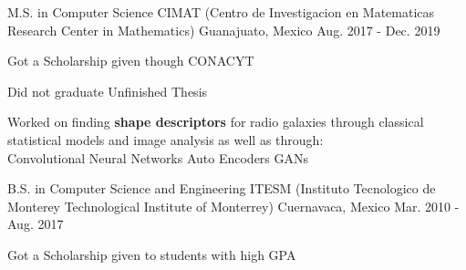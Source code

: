 

\begin{cventries}


\cventry
    {M.S. in Computer Science} %
    {CIMAT (Centro de Investigacion en Matematicas {\enskip\cdotp\enskip} Research Center in Mathematics)} %
    {Guanajuato, Mexico} %
    {Aug. 2017 - Dec. 2019} %
    {
    \begin{cvitems} %
        \item {Got a Scholarship given though CONACYT}
        \item {Did not graduate {\enskip\cdotp\enskip} Unfinished Thesis}
        \item {Worked on finding \textbf{shape descriptors} for radio galaxies through classical statistical models and image analysis as well as through:\\ 
        {\enskip\cdotp\enskip} Convolutional Neural Networks {\enskip\cdotp\enskip} Auto Encoders {\enskip\cdotp\enskip} GANs}
    \end{cvitems}
    }
  \cventry
    {B.S. in Computer Science and Engineering} %
    {ITESM ({Instituto Tecnologico de Monterey\enskip\cdotp\enskip} Technological Institute of Monterrey)} %
    {Cuernavaca, Mexico} %
    {Mar. 2010 - Aug. 2017} %
    {
      \begin{cvitems} %
        \item {Got a Scholarship given to students with high GPA}
      \end{cvitems}
    }

\end{cventries}